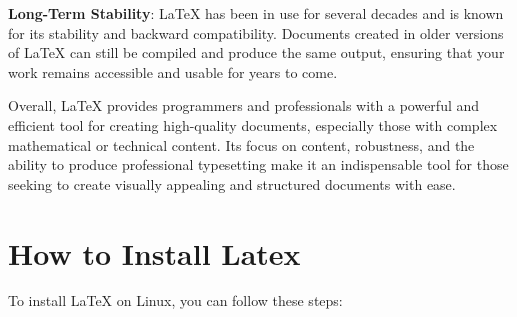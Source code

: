\documentclass[12pt]{article}
\begin{document}
	\textbf{Long-Term Stability}: LaTeX has been in use for several decades and is known for its stability and backward compatibility. Documents created in older versions of LaTeX can still be compiled and produce the same output, ensuring that your work remains accessible and usable for years to come.
	
	Overall, LaTeX provides programmers and professionals with a powerful and efficient tool for creating high-quality documents, especially those with complex mathematical or technical content. Its focus on content, robustness, and the ability to produce professional typesetting make it an indispensable tool for those seeking to create visually appealing and structured documents with ease.

	
	
	
	
	
	
	
	\section{How to Install Latex}
	
	To install LaTeX on Linux, you can follow these steps:
	
\end{document}
